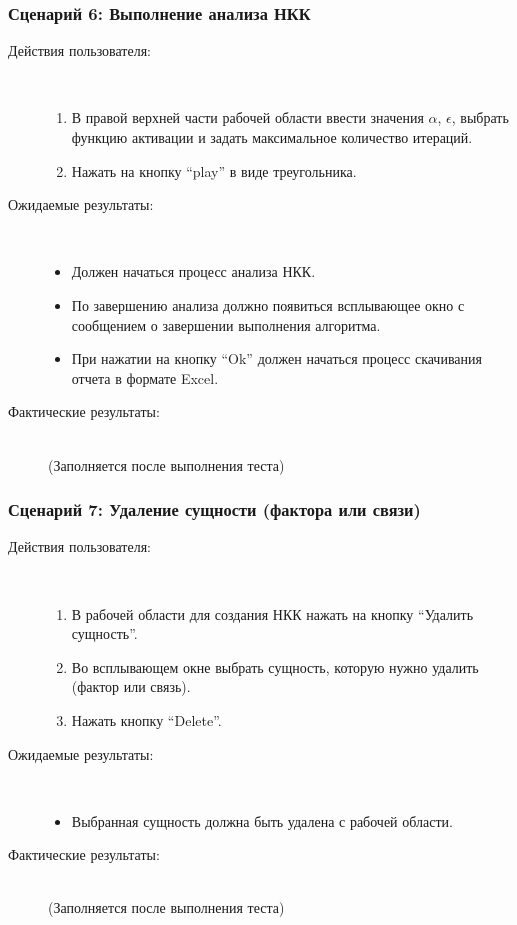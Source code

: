 \documentclass{article}
\begin{document}
    \subsubsection{Сценарий 6: Выполнение анализа НКК}

    \begin{description}
        \item [Действия пользователя:]\\
        \begin{enumerate}
            \item В правой верхней части рабочей области ввести значения $\alpha$, $\epsilon$, выбрать функцию активации и задать максимальное количество итераций.
            \item Нажать на кнопку ``play'' в виде треугольника.
        \end{enumerate}
        \item [Ожидаемые результаты:]\\
        \begin{itemize}
            \item Должен начаться процесс анализа НКК.
            \item По завершению анализа должно появиться всплывающее окно с сообщением о завершении выполнения алгоритма.
            \item При нажатии на кнопку ``Ok'' должен начаться процесс скачивания отчета в формате Excel.
        \end{itemize}
        \item [Фактические результаты:]\\
        (Заполняется после выполнения теста)
    \end{description}

    \subsubsection{Сценарий 7: Удаление сущности (фактора или связи)}

    \begin{description}
        \item [Действия пользователя:]\\
        \begin{enumerate}
            \item В рабочей области для создания НКК нажать на кнопку ``Удалить сущность''.
            \item Во всплывающем окне выбрать сущность, которую нужно удалить (фактор или связь).
            \item Нажать кнопку ``Delete''.
        \end{enumerate}
        \item [Ожидаемые результаты:]\\
        \begin{itemize}
            \item Выбранная сущность должна быть удалена с рабочей области.
        \end{itemize}
        \item [Фактические результаты:]\\
        (Заполняется после выполнения теста)
    \end{description}
\end{document}

